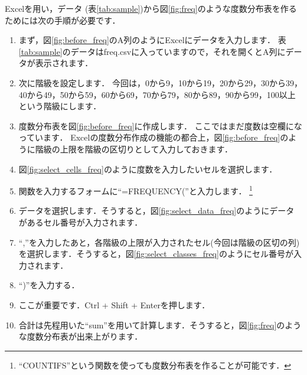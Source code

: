 Excelを用い，データ (表\ref{tab:sample})から図\ref{fig:freq}のような度数分布表を作るためには次の手順が必要です．

\begin{enumerate}
    \item まず，図\ref{fig:before_freq}のA列のようにExcelにデータを入力します．
    表\ref{tab:sample}のデータはfreq.csvに入っていますので，それを開くとA列にデータが表示されます．
    \item 次に階級を設定します．
    今回は，0から9，10から19，20から29，30から39，40から49，50から59，60から69，70から79，80から89，90から99，100以上という階級にします．
    \item 度数分布表を図\ref{fig:before_freq}に作成します．
    ここではまだ度数は空欄になっています．
    Excelの度数分布作成の機能の都合上，図\ref{fig:before_freq}のように階級の上限を階級の区切りとして入力しておきます．
    \item 図\ref{fig:select_cells_freq}のように度数を入力したいセルを選択します．
    \item 関数を入力するフォームに``=FREQUENCY(''と入力します．
    \footnote{``COUNTIFS''という関数を使っても度数分布表を作ることが可能です．}
    \item データを選択します．そうすると，図\ref{fig:select_data_freq}のようにデータがあるセル番号が入力されます．
    \item ``,''を入力したあと，各階級の上限が入力されたセル(今回は階級の区切の列)を選択します．そうすると，図\ref{fig:select_classes_freq}のようにセル番号が入力されます．
    \item ``)''を入力する．
    \item ここが重要です．Ctrl + Shift + Enterを押します．
    \item 合計は先程用いた``sum''を用いて計算します．そうすると，図\ref{fig:freq}のような度数分布表が出来上がります．
\end{enumerate}


